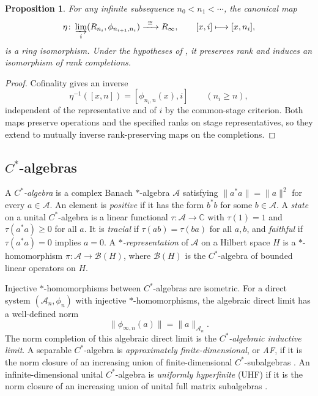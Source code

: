 \documentclass[11pt]{amsart}
\newtheorem{proposition}[theorem]{Proposition}
\theoremstyle{definition}
\theoremstyle{remark}
\begin{document}
\begin{proposition}\label{prop:cofinal-direct-limit}
For any infinite subsequence $n_0<n_1<\cdots$, the canonical map
\[
 \eta\colon\varinjlim_i(R_{n_i},\phi_{n_{i+1},n_i})
 \xrightarrow{\ \cong\ }R_\infty,
 \qquad [x,i]\longmapsto[x,n_i],
\]
is a ring isomorphism.  Under the hypotheses of
, it preserves rank and induces an
isomorphism of rank completions.
\end{proposition}

\begin{proof}
Cofinality gives an inverse
\[
 \eta^{-1}([x,n])=[\phi_{n_i,n}(x),i]\qquad(n_i\geq n),
\]
independent of the representative and of $i$ by the common-stage
criterion.  Both maps preserve operations and the specified ranks on
stage representatives, so they extend to mutually inverse
rank-preserving maps on the completions.
\end{proof}

\subsection{\texorpdfstring{$C^*$}{C*}-algebras}
\label{subsec:cstar-preliminaries}

A \emph{$C^*$-algebra} is a complex Banach $*$-algebra $\mathcal A$
satisfying $\|a^*a\|=\|a\|^2$ for every $a\in\mathcal A$.
An element is \emph{positive} if it has the form $b^*b$ for some \(b\in\mathcal A\).
A \emph{state} on a unital $C^*$-algebra is a linear functional
$\tau\colon\mathcal A\to\mathbb C$ with $\tau(1)=1$ and
$\tau(a^*a)\geq0$ for all $a$.
It is \emph{tracial} if $\tau(ab)=\tau(ba)$ for all $a,b$, and
\emph{faithful} if $\tau(a^*a)=0$ implies $a=0$.
A \emph{$*$-representation} of $\mathcal A$ on a Hilbert space $H$ is a
$*$-homomorphism $\pi\colon\mathcal A\to\mathcal B(H)$, where
$\mathcal B(H)$ is the \(C^{*}\)-algebra of bounded linear operators on $H$.

Injective $*$-homomorphisms between $C^*$-algebras are isometric.
For a direct system $(\mathcal A_n,\phi_n)$ with injective
$*$-homomorphisms, the algebraic direct limit has a well-defined norm
\[
 \|\phi_{\infty,n}(a)\|=\|a\|_{\mathcal A_n}.
\]
The norm completion of this algebraic direct limit is the
\emph{$C^*$-algebraic inductive limit}.
A separable $C^*$-algebra is \emph{approximately finite-dimensional}, or
\emph{AF}, if it is the norm closure of an increasing union of
finite-dimensional $C^*$-subalgebras \cite{Bratteli1972}.
An infinite-dimensional unital $C^*$-algebra is \emph{uniformly
hyperfinite} (UHF) if it is the norm closure of an increasing union
of unital full matrix subalgebras \cite{Glimm1960}.
\end{document}

